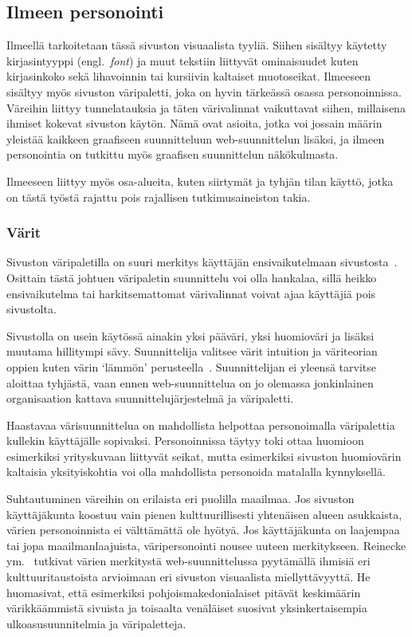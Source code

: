 \documentclass[finnish, 12pt, a4paper, elec, utf8, a-1b, online]{aaltothesis}
\begin{document}
\subsection{Ilmeen personointi}

Ilmeellä tarkoitetaan tässä sivuston visuaalista tyyliä. Siihen sisältyy
käytetty kirjasintyyppi (engl.~\textit{font}) ja muut tekstiin liittyvät
ominaisuudet kuten kirjasinkoko sekä lihavoinnin tai kursiivin kaltaiset
muotoseikat. Ilmeeseen sisältyy myös sivuston väripaletti, joka on hyvin
tärkeässä osassa personoinnissa. Väreihin liittyy tunnelatauksia ja täten
värivalinnat vaikuttavat siihen, millaisena ihmiset kokevat sivuston käytön.
Nämä ovat asioita, jotka voi jossain määrin yleistää kaikkeen graafiseen
suunnitteluun web-suunnittelun lisäksi, ja ilmeen personointia on tutkittu myös
graafisen suunnittelun näkökulmasta.

Ilmeeseen liittyy myös osa-alueita, kuten siirtymät ja tyhjän tilan käyttö,
jotka on tästä työstä rajattu pois rajallisen tutkimusaineiston takia.

\subsubsection{Värit}\label{color-personalization}

Sivuston väripaletilla on suuri merkitys käyttäjän ensivaikutelmaan
sivustosta~\cite{10.1145/2470654.2481281}. Osittain tästä johtuen väripaletin
suunnittelu voi olla hankalaa, sillä heikko ensivaikutelma tai harkitsemattomat
värivalinnat voivat ajaa käyttäjiä pois sivustolta.

Sivustolla on usein käytössä ainakin yksi pääväri, yksi huomioväri ja
lisäksi muutama hillitympi sävy. Suunnittelija valitsee värit intuition ja
väriteorian oppien kuten värin `lämmön' perusteella~\cite{odonovan_2015}.
Suunnittelijan ei yleensä tarvitse aloittaa tyhjästä, vaan ennen
web-suunnittelua on jo olemassa jonkinlainen organisaation kattava
suunnittelujärjestelmä ja väripaletti.

Haastavaa värisuunnittelua on mahdollista helpottaa personoimalla väripalettia
kullekin käyttäjälle sopivaksi. Personoinnissa täytyy toki ottaa huomioon
esimerkiksi yrityskuvaan liittyvät seikat, mutta esimerkiksi sivuston
huomiovärin kaltaisia yksityiskohtia voi olla mahdollista personoida matalalla
kynnyksellä.

Suhtautuminen väreihin on erilaista eri puolilla maailmaa. Jos sivuston
käyttäjäkunta koostuu vain pienen kulttuurillisesti yhtenäisen alueen asukkaista,
värien personoinnista ei välttämättä ole hyötyä. Jos käyttäjäkunta on laajempaa
tai jopa maailmanlaajuista, väripersonointi nousee uuteen merkitykseen. Reinecke
ym.~\cite{10.1145/2556288.2557052} tutkivat värien merkitystä web-suunnittelussa
pyytämällä ihmisiä eri kulttuuritaustoista arvioimaan eri sivuston visuaalista
miellyttävyyttä. He huomasivat, että esimerkiksi pohjoismakedonialaiset pitävät
keskimäärin värikkäämmistä sivuista ja toisaalta venäläiset suosivat
yksinkertaisempia ulkoasusuunnitelmia ja väripaletteja.
\end{document}
